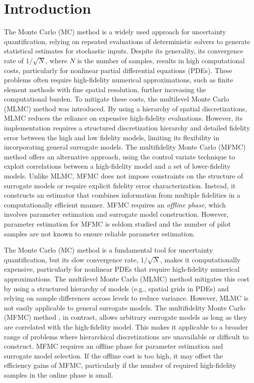 \section{Introduction}\label{sec:intro}
The Monte Carlo (MC) method is a widely used approach for uncertainty quantification, relying on repeated evaluations of deterministic solvers to generate statistical estimates for stochastic inputs. Despite its generality, its convergence rate of $1/\sqrt{N}$, where $N$ is the number of samples, results in high computational costs, particularly for nonlinear partial differential equations (PDEs). These problems often require high-fidelity numerical approximations, such as finite element methods with fine spatial resolution, further increasing the computational burden. To mitigate these costs, the multilevel Monte Carlo (MLMC) \cite{Gi:2008,Gi:2015} method was introduced. By using a hierarchy of spatial discretizations, MLMC reduces the reliance on expensive high-fidelity evaluations. However, its implementation requires a structured discretization hierarchy and detailed fidelity error between the high and low fidelity models, limiting its flexibility in incorporating general surrogate models. The multifidelity Monte Carlo (MFMC) method \cite{PeGuWi:2018,PeWiGu:2016,PeWiGu:2018} offers an alternative approach, using the control variate technique to exploit correlations between a high-fidelity model and a set of lower-fidelity models. Unlike MLMC, MFMC does not impose constraints on the structure of surrogate models or require explicit fidelity error characterization. Instead, it constructs an estimator that combines information from multiple fidelities in a computationally efficient manner. MFMC requires an \textit{offline phase}, which involves parameter estimation and surrogate model construction. However, parameter estimation for MFMC is seldom studied and the number of pilot samples are not known to ensure reliable parameter estimation.



The Monte Carlo (MC) method is a fundamental tool for uncertainty quantification, but its slow convergence rate, $1/\sqrt{N}$, makes it computationally expensive, particularly for nonlinear PDEs that require high-fidelity numerical approximations. The multilevel Monte Carlo (MLMC) method \cite{Gi:2008,Gi:2015} mitigates this cost by using a structured hierarchy of models (e.g., spatial grids in PDEs) and relying on sample differences across levels to reduce variance. However, MLMC is not easily applicable to general surrogate models. The multifidelity Monte Carlo (MFMC) method \cite{PeGuWi:2018,PeWiGu:2016,PeWiGu:2018}, in contrast, allows arbitrary surrogate models as long as they are correlated with the high-fidelity model. This makes it applicable to a broader range of problems where hierarchical discretizations are unavailable or difficult to construct. MFMC requires an offline phase for parameter estimation and surrogate model selection. If the offline cost is too high, it may offset the efficiency gains of MFMC, particularly if the number of required high-fidelity samples in the online phase is small. 

